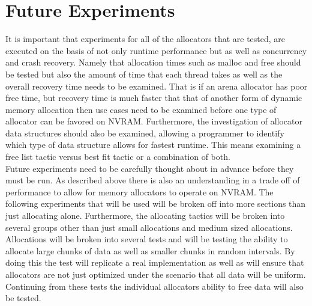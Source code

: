 \documentclass[conference]{IEEEtran}
\begin{document}
\section{Future Experiments}
It is important that experiments for all of the allocators that are tested, are executed on the basis of not only runtime performance but as well as concurrency and crash recovery. Namely that allocation times such as malloc and free should be tested but also the amount of time that each thread takes as well as the overall recovery time needs to be examined. That is if an arena allocator has poor free time, but recovery time is much faster that that of another form of dynamic memory allocation then use cases need to be examined before one type of allocator can be favored on NVRAM. Furthermore, the investigation of allocator data structures should also be examined, allowing a programmer to identify which type of data structure allows for fastest runtime. This means examining a free list tactic versus best fit tactic or a combination of both. 
\\
Future experiments need to be carefully thought about in advance before they must be run. As described above there is also an understanding in a trade off of performance to allow for memory allocators to operate on NVRAM. The following experiments that will be used will be broken off into more sections than just allocating alone. Furthermore, the allocating tactics will be broken into several groups other than just small allocations and medium sized allocations. Allocations will be broken into several tests and will be testing the ability to allocate large chunks of data as well as smaller chunks in random intervals. By doing this the test will replicate a real implementation as well as will ensure that allocators are not just optimized under the scenario that all data will be uniform. Continuing from these tests the individual allocators ability to free data will also be tested. 
\end{document}
